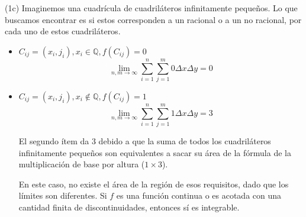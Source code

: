 \begin{exercise}

(1c) Imaginemos una cuadr\'icula de cuadril\'ateros infinitamente pequeños. Lo que buscamos encontrar es si estos corresponden a un racional o a un no racional, por cada uno de estos cuadril\'ateros.

\begin{itemize}

\item $C_{ij}=(x_i,j_i),x_i \in \mathbb{Q},f(C_{ij})=0$
$$
\lim\limits_{n,m \longrightarrow \infty}\sum_{i=1}^{n}\sum_{j=1}^{m}0\Delta x \Delta y = 0
$$

\item $C_{ij}=(x_i,j_i),x_i \not\in \mathbb{Q},f(C_{ij})=1$
$$
\lim\limits_{n,m \longrightarrow \infty}\sum_{i=1}^{n}\sum_{j=1}^{m}1\Delta x \Delta y = 3
$$

El segundo \'item da 3 debido a que la suma de todos los cuadril\'ateros infinitamente pequeños son equivalentes a sacar su \'area de la f\'ormula de la multiplicaci\'on de base por altura ($1\times 3$).

En este caso, no existe el \'area de la regi\'on de esos requisitos, dado que los l\'imites son diferentes. Si $f$ es una funci\'on continua o es acotada con una cantidad finita de discontinuidades, entonces s\'i es integrable.

\end{itemize}

\end{exercise}